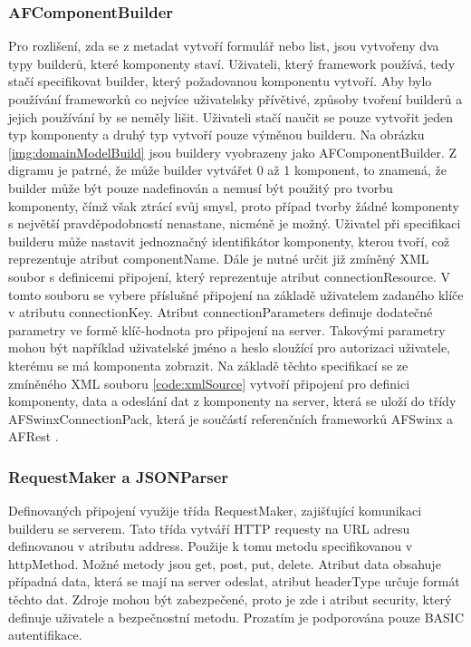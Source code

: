 \subsubsection{AFComponentBuilder}
Pro rozlišení, zda se z metadat vytvoří formulář nebo list, jsou vytvořeny dva typy builderů, které komponenty staví. Uživateli, který framework používá, tedy stačí specifikovat builder, který požadovanou komponentu vytvoří. Aby bylo používání frameworků co nejvíce uživatelsky přívětivé, způsoby tvoření builderů a jejich používání by se neměly lišit. Uživateli stačí naučit se pouze vytvořit jeden typ komponenty a druhý typ vytvoří pouze výměnou builderu. Na obrázku \ref{img:domainModelBuild} jsou buildery vyobrazeny jako AFComponentBuilder. Z digramu je patrné, že může builder vytvářet 0 až 1 komponent, to znamená, že builder může být pouze nadefinován a nemusí být použitý pro tvorbu komponenty, čímž však ztrácí svůj smysl, proto případ tvorby žádné komponenty s největší pravděpodobností nenastane, nicméně je možný. Uživatel při specifikaci builderu může nastavit jednoznačný identifikátor komponenty, kterou tvoří, což reprezentuje atribut componentName. Dále je nutné určit již zmíněný XML soubor s definicemi připojení, který reprezentuje atribut connectionResource. V tomto souboru se vybere příslušné připojení na základě uživatelem zadaného klíče v atributu connectionKey. Atribut connectionParameters definuje dodatečné parametry ve formě klíč-hodnota pro připojení na server. Takovými parametry mohou být například uživatelské jméno a heslo sloužící pro autorizaci uživatele, kterému se má komponenta zobrazit. Na základě těchto specifikací se ze zmíněného XML souboru \ref{code:xmlSource} vytvoří připojení pro definici komponenty, data a odeslání dat z komponenty na server, která se uloží do třídy AFSwinxConnectionPack, která je součástí referenčních frameworků AFSwinx a AFRest \cite{tomasek-thesis}.

\subsubsection{RequestMaker a JSONParser}
Definovaných připojení využije třída RequestMaker, zajišťující komunikaci builderu se serverem. Tato třída vytváří HTTP requesty na URL adresu definovanou v atributu address. Použije k tomu metodu specifikovanou v httpMethod. Možné metody jsou get, post, put, delete. Atribut data obsahuje případná data, která se mají na server odeslat, atribut headerType určuje formát těchto dat. Zdroje mohou být zabezpečené, proto je zde i atribut security, který definuje uživatele a bezpečnostní metodu. Prozatím je podporována pouze BASIC autentifikace.

